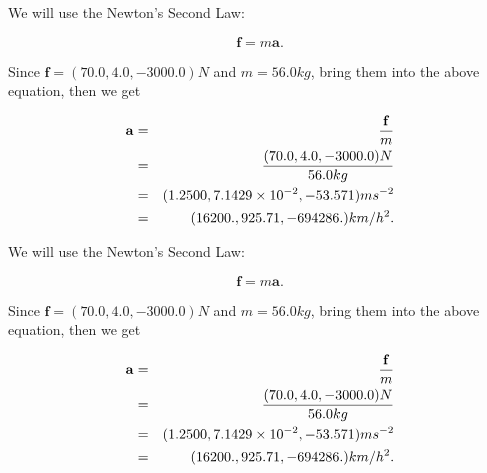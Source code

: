 \documentclass[12pt]{article}
\begin{document}
 
 
 
\noindent{}
 
 

We will use the Newton's Second Law:
 
\[
\mathbf{f}=m\mathbf{a}.
\]
 
Since $\mathbf{f}=( %
70.0,  %
4.0,  %
-3000.0 )N$
and $m= %
56.0 kg$, bring them into the above equation, then we get
 
\begin{eqnarray*}
\mathbf{a}&=&\frac{\mathbf{f}}m  \\
&=&\frac{(
70.0 ,
4.0 ,
-3000.0 )N
}{ %
56.0 kg}  \\
&=&(
1.2500 ,
7.1429 \times 10^{-2},
-53.571
)ms^{-2} \\
&=&(
16200. ,
925.71 ,
-694286.
)km/h^2.
\end{eqnarray*}
 
 
 
\noindent{}
 
 

 
 
 
\noindent{}
 
 

We will use the Newton's Second Law:
 
\[
\mathbf{f}=m\mathbf{a}.
\]
 
Since $\mathbf{f}=( %
70.0,  %
4.0,  %
-3000.0 )N$
and $m= %
56.0 kg$, bring them into the above equation, then we get
 
\begin{eqnarray*}
\mathbf{a}&=&\frac{\mathbf{f}}m  \\
&=&\frac{(
70.0 ,
4.0 ,
-3000.0 )N
}{ %
56.0 kg}  \\
&=&(
1.2500 ,
7.1429 \times 10^{-2},
-53.571
)ms^{-2} \\
&=&(
16200. ,
925.71 ,
-694286.
)km/h^2.
\end{eqnarray*}
 
 
 
\noindent{}
 
 

 
\vspace{0.3in}
   
   
   
\end{document}
